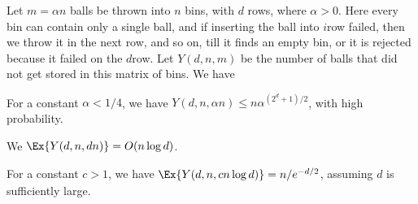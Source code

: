 \begin{lemma}
    Let $m = \alpha n$ balls be thrown into $n$ bins, with $d$ rows,
    where $\alpha >0$. Here every bin can contain only a single ball,
    and if inserting the ball into  $i$\th row failed, then we throw
    it in the next row, and so on, till it finds an empty bin, or it is
    rejected because it failed on the $d$\th row. Let $Y(d,n, m)$ be
    the number of balls that did not get stored in this matrix of
    bins. We have
    \begin{compactenumA}
        \item For a constant $\alpha<1/4$, we have
        $Y(d,n, \alpha n ) \leq n \alpha^{(2^{d} + 1)/2}$, with high
        probability.

        \item {} We
        $\Ex{\bigl. Y(d,n, dn)} = O( n \log d) $.

        \item For a constant $c>1$, we have
        $\Ex{\bigl. Y(d,n, c n \log d )} = n/e^{-d/2} $, assuming $d$
        is sufficiently large.

    \end{compactenumA}
    
\end{lemma}

